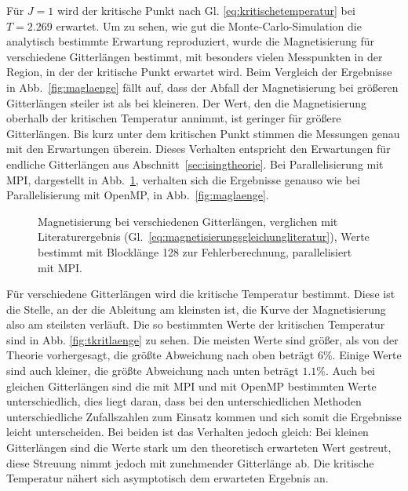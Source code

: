	
	Für $J=1$ wird der kritische Punkt nach Gl. \ref{eq:kritischetemperatur} bei $T=\num{2,269}$ erwartet.
	Um zu sehen, wie gut die Monte-Carlo-Simulation die analytisch bestimmte Erwartung reproduziert, wurde die Magnetisierung für verschiedene Gitterlängen bestimmt, mit besonders vielen Messpunkten in der Region, in der der kritische Punkt erwartet wird. Beim Vergleich der Ergebnisse in Abb.~\ref{fig:maglaenge} fällt auf, dass der Abfall der Magnetisierung bei größeren Gitterlängen steiler ist als bei kleineren. Der Wert, den die Magnetisierung oberhalb der kritischen Temperatur annimmt, ist geringer für größere Gitterlängen. Bis kurz unter dem kritischen Punkt stimmen die Messungen genau mit den Erwartungen überein. Dieses Verhalten entspricht den Erwartungen für endliche Gitterlängen aus Abschnitt~\ref{sec:isingtheorie}. Bei Parallelisierung mit MPI, dargestellt in Abb.~\ref{fig:maglaengempi}, verhalten sich die Ergebnisse genauso wie bei Parallelisierung mit OpenMP, in Abb.~\ref{fig:maglaenge}.
	
	
	\begin{figure}[htbp]
		
		\caption[Magnetisierung bei verschiedenen Gitterlängen und Verwendung von MPI]{Magnetisierung bei verschiedenen Gitterlängen, verglichen mit Literaturergebnis (Gl.~\ref{eq:magnetisierungsgleichungliteratur}), Werte bestimmt mit Blocklänge 128 zur Fehlerberechnung, parallelisiert mit MPI.}
		\label{fig:maglaengempi}
	\end{figure}

	Für verschiedene Gitterlängen wird die kritische Temperatur bestimmt. Diese ist die Stelle, an der die Ableitung am kleinsten ist, die Kurve der Magnetisierung also am steilsten verläuft. Die so bestimmten Werte der kritischen Temperatur sind in Abb. \ref{fig:tkritlaenge} zu sehen. Die meisten Werte sind größer, als von der Theorie vorhergesagt, die größte Abweichung nach oben beträgt 6\%. Einige Werte sind auch kleiner, die größte Abweichung nach unten beträgt $\num{1,1}\%$. Auch bei gleichen Gitterlängen sind die mit MPI und mit OpenMP bestimmten Werte unterschiedlich, dies liegt daran, dass bei den unterschiedlichen Methoden unterschiedliche Zufallszahlen zum Einsatz kommen und sich somit die Ergebnisse leicht unterscheiden. Bei beiden ist das Verhalten jedoch gleich: Bei kleinen Gitterlängen sind die Werte stark um den theoretisch erwarteten Wert gestreut, diese Streuung nimmt jedoch mit zunehmender Gitterlänge ab. Die kritische Temperatur nähert sich asymptotisch dem erwarteten Ergebnis an.
	
